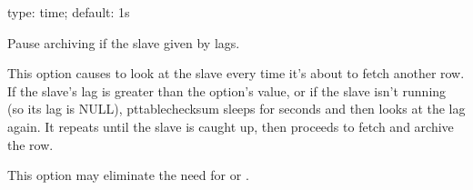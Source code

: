 \documentclass[letterpaper,10pt,english]{sphinxmanual}
\begin{document}
\begin{fulllineitems}
\label{\detokenize{mariadb-archiver:cmdoption-mariadb-archiver-max-lag}}
\sphinxAtStartPar
type: time; default: 1s

\sphinxAtStartPar
Pause archiving if the slave given by {\hyperref[\detokenize{mariadb-archiver:cmdoption-mariadb-archiver-check-slave-lag}]{}} lags.

\sphinxAtStartPar
This option causes  to look at the slave every time it’s about
to fetch another row.  If the slave’s lag is greater than the option’s value,
or if the slave isn’t running (so its lag is NULL), pt\sphinxhyphen{}table\sphinxhyphen{}checksum sleeps
for {\hyperref[\detokenize{mariadb-archiver:cmdoption-mariadb-archiver-check-interval}]{}} seconds and then looks at the lag again.  It repeats
until the slave is caught up, then proceeds to fetch and archive the row.

\sphinxAtStartPar
This option may eliminate the need for {\hyperref[\detokenize{mariadb-archiver:cmdoption-mariadb-archiver-sleep}]{}} or {\hyperref[\detokenize{mariadb-archiver:cmdoption-mariadb-archiver-sleep-coef}]{}}.

\end{fulllineitems}

\end{document}
